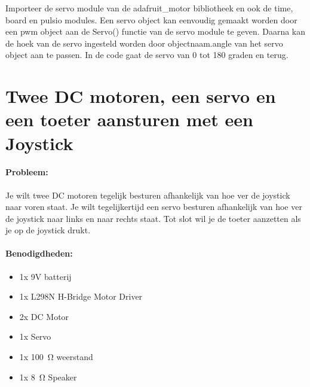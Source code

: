 Importeer de servo module van de adafruit\_motor bibliotheek en ook de time, board en pulsio modules. Een servo object kan eenvoudig gemaakt worden door een pwm object aan de Servo() functie van de servo module te geven. Daarna kan de hoek van de servo ingesteld worden door objectnaam.angle van het servo object aan te passen. In de code gaat de servo van 0 tot 180 graden en terug.\\


\newpage
\section{Twee DC motoren, een servo en een toeter aansturen met een Joystick} \label{sec:DC_Servo_Toeter_Joystick}
\paragraph{Probleem:} Je wilt twee DC motoren tegelijk besturen afhankelijk van hoe ver de joystick naar voren staat. Je wilt tegelijkertijd een servo besturen afhankelijk van hoe ver de joystick naar links en naar rechts staat. Tot slot wil je de toeter aanzetten als je op de joystick drukt.

\paragraph{Benodigdheden:}
\begin{itemize}
	\item 1x 9V batterij
	\item 1x L298N H-Bridge Motor Driver
	\item 2x DC Motor
	\item 1x Servo
	\item 1x \SI{100}{\ohm} weerstand
	\item 1x \SI{8}{\ohm} Speaker
\end{itemize}

